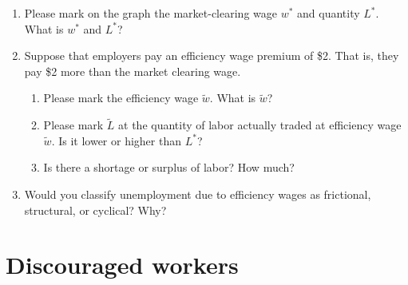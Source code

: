 \documentclass[
    letterpaper,paper=portrait,fleqn,
    DIV=16,fontsize=12pt,twoside=semi,
    parskip=full-,
    headings=standardclasses]
{scrartcl}
\begin{document}
\begin{enumerate}
\item Please mark on the graph the market-clearing wage $w^*$ and quantity $L^*$. What is $w^*$ and $L^*$?

\vfill

\clearpage

\item Suppose that employers pay an efficiency wage premium of \$2. That is, they pay \$2 more than the market clearing wage.

\begin{enumerate}

\item Please mark the efficiency wage $\widetilde{w}$. What is $\widetilde{w}$?

\vfill

\item Please mark $\widetilde{L}$ at the quantity of labor actually traded at efficiency wage $\widetilde{w}$. Is it lower or higher than $L^*$?

\vfill

\item Is there a shortage or surplus of labor? How much?

\vfill
\vfill

\end{enumerate}

\item Would you classify unemployment due to efficiency wages as frictional, structural, or cyclical? Why?

\vfill
\vfill

\end{enumerate}

\clearpage

\section{Discouraged workers}
\end{document}
